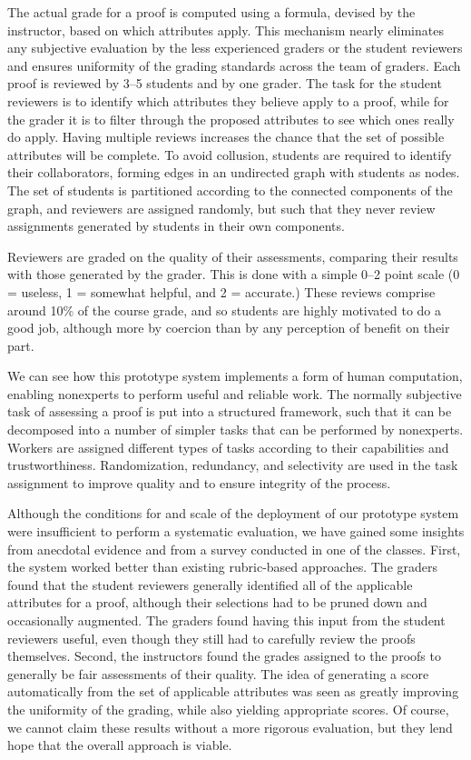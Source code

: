 \documentclass[12pt]{article}
\begin{document}
The actual grade for a proof is computed using a formula, devised
by the instructor, based on which attributes apply.  This mechanism
nearly eliminates any subjective evaluation by the less experienced graders
or the student reviewers and ensures uniformity of the grading
standards across the team of graders.  Each proof is reviewed by 3--5
students and by one grader.  The task for the student reviewers is to
identify which attributes they believe apply to a proof, while for the
grader it is to filter through the proposed attributes to see which
ones really do apply.  Having multiple reviews increases the chance
that the set of possible attributes will be complete.  To avoid
collusion, students are required to identify their collaborators,
forming edges in an undirected graph with students as nodes.  The
set of students is partitioned according to the connected components
of the graph, and
reviewers are assigned randomly, but such that they never review
assignments generated by students in their own components.

Reviewers are graded on the quality of their assessments, comparing
their results with those generated by the grader.  This is done with a
simple 0--2 point scale (0 = useless, 1 = somewhat helpful, and 2 =
accurate.)  These reviews comprise around 10\% of the course grade,
and so students are highly motivated to do a good job, although more
by coercion than by any perception of benefit on their part.

We can see how this prototype system implements a form of human computation,
enabling nonexperts to perform useful and reliable work.  The normally
subjective task of assessing a proof is put into a structured
framework, such that it can be decomposed into a number of simpler
tasks that can be performed by nonexperts.  Workers are assigned
different types of tasks according to their capabilities and trustworthiness.
Randomization, redundancy, and selectivity are used in the task assignment to
improve quality and to ensure integrity of the process.

Although the conditions for and scale of the deployment of our
prototype system were insufficient to perform a systematic evaluation,
we have gained some insights from anecdotal evidence and from a survey
conducted in one of the classes.  First, the system worked better than existing
rubric-based approaches.
The graders found that the student
reviewers generally identified all of the applicable attributes for a
proof, although their selections had to be pruned down and
occasionally augmented.  The graders found having this input from the
student reviewers useful, even though they still had to carefully
review the proofs themselves.  Second, the instructors found the
grades assigned to the proofs to generally be fair assessments of
their quality.  The idea of generating a score automatically from the
set of applicable attributes was seen as greatly improving the
uniformity of the grading, while also yielding appropriate scores.
Of course, we cannot claim these results without a more rigorous
evaluation, but they lend hope that the overall approach is viable.
\end{document}

